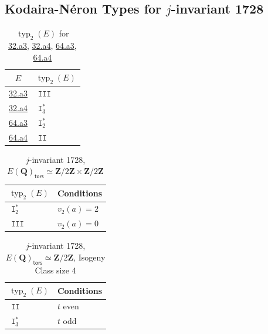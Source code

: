 \documentclass{amsart}
\newcommand{\Z}{\mathbf{Z}}
\newcommand{\Q}{\mathbf{Q}}
\newcommand{\tors}{\mathsf{tors}}
\DeclareMathOperator{\typ}{{typ}}
\DeclareMathOperator{\I}{\mathtt{I}}
\DeclareMathOperator{\II}{\mathtt{II}}
\DeclareMathOperator{\III}{\mathtt{III}}
\numberwithin{equation}{section}
\theoremstyle{plain}
\theoremstyle{remark}
\begin{document}
\newpage

\subsection{Kodaira-N\'eron Types for $j$-invariant 1728}

\begin{center}
\begin{table}[h] 
\begin{tabular}{|cl|}
\hline
$E$ & $\typ_2(E)$ \\
\hline
\href{https://beta.lmfdb.org/EllipticCurve/Q/32/a/3}{32.a3} & $\III$  \\
\href{https://beta.lmfdb.org/EllipticCurve/Q/34/a/4}{32.a4} & $\I_3^*$ \\
\href{https://beta.lmfdb.org/EllipticCurve/Q/64/a/3}{64.a3} & $\I_2^*$ \\
\href{https://beta.lmfdb.org/EllipticCurve/Q/64/a/4}{64.a4} & $\II$ \\
\hline
\end{tabular}
\caption{$\typ_2(E)$ for \href{https://beta.lmfdb.org/EllipticCurve/Q/32/a/3}{32.a3},
\href{https://beta.lmfdb.org/EllipticCurve/Q/32/a/4}{32.a4}, 
\href{https://beta.lmfdb.org/EllipticCurve/Q/64/a/3}{64.a3}, 
\href{https://beta.lmfdb.org/EllipticCurve/Q/64/a/4}{64.a4}} \label{j1728_finite_tables}
\end{table} 
\end{center}

\begin{center}
 \begin{table}[h]
 \begin{tabular}{|l|l|}
 \hline
$\typ_2(E)$ & Conditions \\
 \hline
 $\I_2^*$ & $v_2(a) = 2$\\
 $\III$ & $v_2(a) = 0$\\ 
  \hline 
\end{tabular}
 \caption{$j$-invariant 1728, $E(\Q)_\tors \simeq \Z/2\Z \times \Z/2\Z$} \label{j1728_(2,2)tors}
 \end{table}
 \end{center}

\begin{center}
\begin{table}[h]
 \begin{tabular}{|l|l|}
 \hline
$\typ_2(E)$ & Conditions \\
 \hline
 $\II$ & $t$ even \\
 $\I_3^*$ & $t$ odd \\
\hline
\end{tabular}
 \caption{$j$-invariant 1728, $E(\Q)_\tors \simeq \Z/2\Z$, Isogeny Class size 4} \label{j1728-Z2tors-size4}
 \end{table}
  \end{center}
\end{document}
